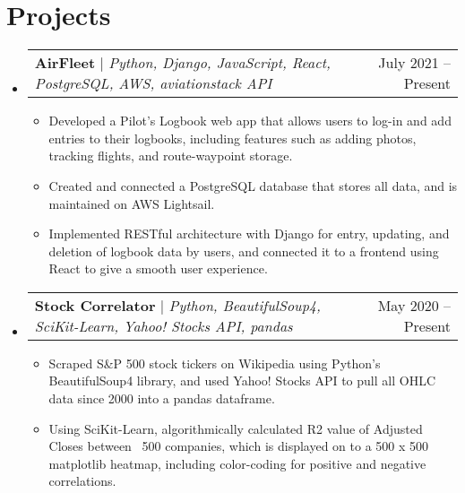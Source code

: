 \documentclass[letterpaper,11pt]{article}
\makeatletter
\newcommand{\resumeItem}[1]{
  \item\small{
    {#1 \vspace{-2pt}}
  }
}
\newcommand{\resumeProjectHeading}[2]{
    \item
    \begin{tabular*}{0.97\textwidth}{l@{\extracolsep{\fill}}r}
      \small#1 & #2 \\
    \end{tabular*}\vspace{-7pt}
}
\newcommand{\resumeSubHeadingListStart}{\begin{itemize}[leftmargin=0.15in, label={}]}
\newcommand{\resumeSubHeadingListEnd}{\end{itemize}}
\newcommand{\resumeItemListStart}{\begin{itemize}}
\newcommand{\resumeItemListEnd}{\end{itemize}\vspace{-5pt}}
\makeatother
\begin{document}
\section{Projects}
    \resumeSubHeadingListStart
      \resumeProjectHeading
          {\textbf{AirFleet} $|$ \emph{Python, Django, JavaScript, React, PostgreSQL, AWS, aviationstack API}}{July 2021 -- Present}
          \resumeItemListStart
            \resumeItem{Developed a Pilot’s Logbook web app that allows users to log-in and add entries to their logbooks, including features such as adding photos, tracking flights, and route-waypoint storage.}
            \resumeItem{Created and connected a PostgreSQL database that stores all data, and is maintained on AWS Lightsail.}
            \resumeItem{Implemented RESTful architecture with Django for entry, updating, and deletion of logbook data by users, and connected it to a frontend using React to give a smooth user experience.}
          \resumeItemListEnd
      \resumeProjectHeading
          {\textbf{Stock Correlator} $|$ \emph{Python, BeautifulSoup4, SciKit-Learn, Yahoo! Stocks API, pandas}}{May 2020 -- Present}
          \resumeItemListStart
            \resumeItem{Scraped S\&P 500 stock tickers on Wikipedia using Python's BeautifulSoup4 library, and used Yahoo! Stocks API to pull all OHLC data since 2000 into a pandas dataframe.}
            \resumeItem{Using SciKit-Learn, algorithmically calculated R2 value of Adjusted Closes between ~500
            companies, which is displayed on to a 500 x 500 matplotlib heatmap, including color-coding for
            positive and negative correlations.}
          \resumeItemListEnd
    \resumeSubHeadingListEnd



%



\end{document}
